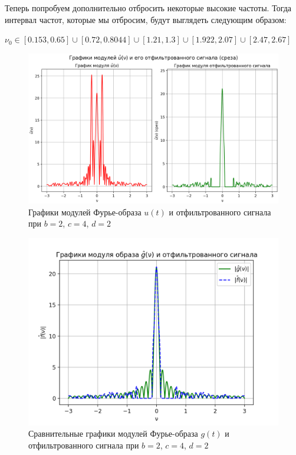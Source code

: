 Теперь попробуем дополнительно отбросить некоторые высокие частоты. Тогда интервал частот, которые мы отбросим, будут выглядеть следующим образом:

\begin{center}
    $\nu_0 \in [0.153, 0.65] \cup [0.72, 0.8044] \cup [1.21, 1.3] \cup [1.922, 2.07] \cup [2.47, 2.67]$
\end{center}

\begin{figure}[ht!]
    \centering
    \includegraphics[scale=0.55]{media/1 task/specific_freq/Fourier_Image_2_4_2_-0,65:-0,153_-0,8044:-0,72_-1,3:-1,21_-2,07:-1,922_-2,67:-2,47.png}
    \caption{Графики модулей Фурье-образа $u(t)$ и отфильтрованного сигнала при $b=2$,  $c=4$,  $d=2$}
    \label{fig:four_2_4_2_5intervals}
\end{figure}

\begin{figure}[ht!]
    \centering
    \includegraphics[scale=0.55]{media/1 task/specific_freq/Fourier_Image_Comparison_2_4_2_-0,65:-0,153_-0,8044:-0,72_-1,3:-1,21_-2,07:-1,922_-2,67:-2,47.png}
    \caption{Сравнительные графики модулей Фурье-образа $g(t)$ и отфильтрованного сигнала при $b=2$,  $c=4$,  $d=2$}
    \label{fig:fourc_2_4_2_5intervlas}
\end{figure}

